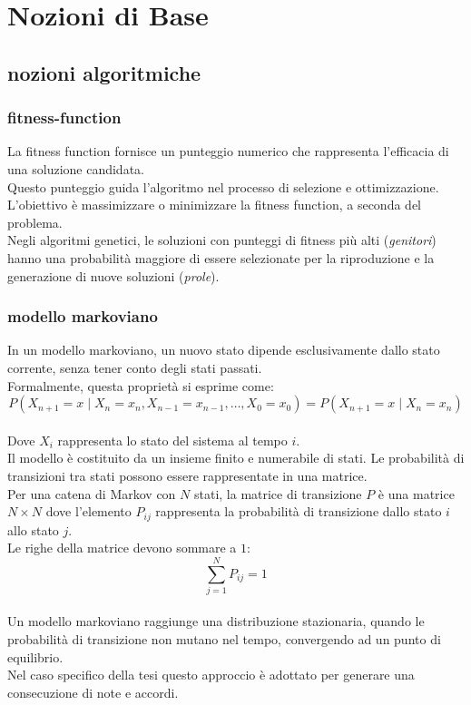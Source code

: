 \documentclass[a4paper,12pt]{report}
\begin{document}
\chapter{Nozioni di Base}

\section{nozioni algoritmiche}

\subsection{fitness-function}

La fitness function fornisce un punteggio numerico che rappresenta l'efficacia di una soluzione candidata. \\
Questo punteggio guida l'algoritmo nel processo di selezione e ottimizzazione. \\
L'obiettivo è massimizzare o minimizzare la fitness function, a seconda del problema. \\
Negli algoritmi genetici, le soluzioni con punteggi di fitness più alti (\textit{genitori}) hanno una probabilità maggiore di essere selezionate per la riproduzione e la generazione di nuove soluzioni (\textit{prole}).

\subsection{modello markoviano}

In un modello markoviano, un nuovo stato dipende esclusivamente dallo stato corrente, senza tener conto degli stati passati. \\
Formalmente, questa proprietà si esprime come: \\
\[
P(X_{n+1} = x \mid X_n = x_n, X_{n-1} = x_{n-1}, \ldots, X_0 = x_0) = P(X_{n+1} = x \mid X_n = x_n)
\]
\\
Dove $X_i$ rappresenta lo stato del sistema al tempo $i$. \\
Il modello è costituito da un insieme finito e numerabile di stati. Le probabilità di transizioni tra stati possono essere rappresentate in una matrice. \\
Per una catena di Markov con $N$ stati, la matrice di transizione $P$ è una matrice $N×N$ dove l'elemento $P_{ij}$ rappresenta la probabilità di transizione dallo stato $i$ allo stato $j$. \\
Le righe della matrice devono sommare a $1$: \\
\[
\sum_{j=1}^{N} P_{ij} = 1
\]
\\
Un modello markoviano raggiunge una distribuzione stazionaria, quando le probabilità di transizione non mutano nel tempo, convergendo ad un punto di equilibrio. \\
Nel caso specifico della tesi questo approccio è adottato per generare una consecuzione di note e accordi.
\end{document}
